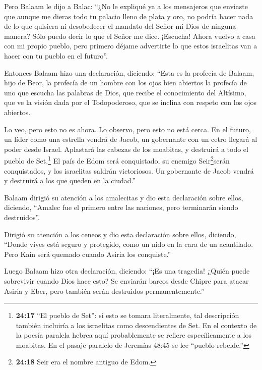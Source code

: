  Pero Balaam le dijo a Balac: ``¿No le expliqué ya a los
mensajeros que enviaste  que aunque me dieras todo tu
palacio lleno de plata y oro, no podría hacer nada de lo que quisiera ni
desobedecer el mandato del Señor mi Dios de ninguna manera? Sólo puedo
decir lo que el Señor me dice.  ¡Escucha! Ahora vuelvo a
casa con mi propio pueblo, pero primero déjame advertirte lo que estos
israelitas van a hacer con tu pueblo en el futuro''.

 Entonces Balaam hizo una declaración, diciendo: ``Esta es
la profecía de Balaam, hijo de Beor, la profecía de un hombre con los
ojos bien abiertos  la profecía de uno que escucha las
palabras de Dios, que recibe el conocimiento del Altísimo, que ve la
visión dada por el Todopoderoso, que se inclina con respeto con los ojos
abiertos.

 Lo veo, pero esto no es ahora. Lo observo, pero esto no
está cerca. En el futuro, un líder como una estrella vendrá de Jacob, un
gobernante con un cetro llegará al poder desde Israel. Aplastará las
cabezas de los moabitas, y destruirá a todo el pueblo de Set.\footnote{\textbf{24:17}
  ``El pueblo de Set'': si esto se tomara literalmente, tal descripción
  también incluiría a los israelitas como descendientes de Set. En el
  contexto de la poesía paralela hebrea aquí probablemente se refiere
  específicamente a los moabitas. En el pasaje paralelo de Jeremías
  48:45 se lee ``pueblo rebelde.''}  El país de Edom será
conquistado, su enemigo Seir\footnote{\textbf{24:18} Seir era el nombre
  antiguo de Edom.}serán conquistados, y los israelitas saldrán
victoriosos.  Un gobernante de Jacob vendrá y destruirá a
los que queden en la ciudad.''

 Balaam dirigió su atención a los amalecitas y dio esta
declaración sobre ellos, diciendo, ``Amalec fue el primero entre las
naciones, pero terminarán siendo destruidos''.

 Dirigió su atención a los ceneos y dio esta declaración
sobre ellos, diciendo, ``Donde vives está seguro y protegido, como un
nido en la cara de un acantilado.  Pero Kain será quemado
cuando Asiria los conquiste.''

 Luego Balaam hizo otra declaración, diciendo: ``¡Es una
tragedia! ¿Quién puede sobrevivir cuando Dios hace esto? 
Se enviarán barcos desde Chipre para atacar Asiria y Eber, pero también
serán destruidos permanentemente.''

